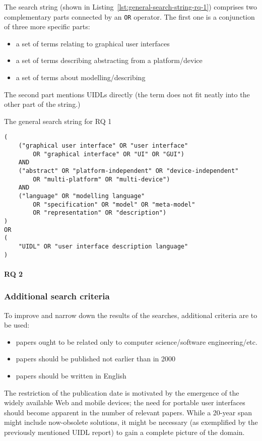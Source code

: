 The search string (shown in Listing~\ref{lst:general-search-string-rq-1})
comprises two complementary parts connected by an \texttt{OR} operator.
The first one is a conjunction of three more specific parts:
\begin{itemize}
    \item a set of terms relating to graphical user interfaces
    \item a set of terms describing abstracting from a platform/device
    \item a set of terms about modelling/describing
\end{itemize}
The second part mentions UIDLs directly (the term does not fit neatly into the other part of the string.)

\begin{listing}
    \caption{The general search string for RQ 1}
    \begin{verbatim}
(
    ("graphical user interface" OR "user interface"
        OR "graphical interface" OR "UI" OR "GUI")
    AND
    ("abstract" OR "platform-independent" OR "device-independent"
        OR "multi-platform" OR "multi-device")
    AND
    ("language" OR "modelling language"
        OR "specification" OR "model" OR "meta-model"
        OR "representation" OR "description")
)
OR
(
    "UIDL" OR "user interface description language"
)
    \end{verbatim}
    \label{lst:general-search-string-rq-1}
\end{listing}

\paragraph{RQ 2}

\subsubsection{Additional search criteria}

To improve and narrow down the results of the searches, additional criteria are to be used:
\begin{itemize}
    \item papers ought to be related only to computer science/software engineering/etc.
    \item papers should be published not earlier than in 2000
    \item papers should be written in English
\end{itemize}

The restriction of the publication date is motivated by the emergence of the widely available Web and mobile devices;
the need for portable user interfaces should become apparent in the number of relevant papers.
While a 20-year span might include now-obsolete solutions, it might be necessary
(as exemplified by the previously mentioned UIDL report) to gain a complete picture of the domain.
